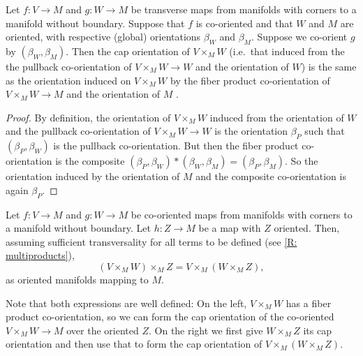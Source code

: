 \begin{lemma}\label{L: same induced}
	Let $f \colon V \to M$ and $g \colon W \to M$ be transverse maps from manifolds with corners to a manifold without boundary.
	Suppose that $f$ is co-oriented and that $W$ and $M$ are oriented, with respective (global) orientations $\beta_W$ and $\beta_M$.
	Suppose we co-orient $g$ by $(\beta_W,\beta_M)$.
	Then the cap orientation of $V \times_M W$ (i.e.\ that induced from the the pullback co-orientation of $V \times_M W \to W$ and the orientation of $W$) is the same as the orientation induced on $V \times_M W$ by the fiber product co-orientation of $V \times_M W \to M$ and the orientation of $M$ .
\end{lemma}

\begin{proof}
	By definition, the orientation of $V \times_M W$ induced from the orientation of $W$ and the pullback co-orientation of $V \times_M W \to W$ is the orientation $\beta_P$ such that $(\beta_P,\beta_W)$ is the pullback co-orientation.
	But then the fiber product co-orientation is the composite $(\beta_P,\beta_W)*(\beta_W,\beta_M) = (\beta_P,\beta_M)$.
	So the orientation induced by the orientation of $M$ and the composite co-orientation is again $\beta_P$.
\end{proof}

\begin{proposition}\label{P: OC mixed associativity}
	Let $f \colon V \to M$ and $g \colon W \to M$ be co-oriented maps from manifolds with corners to a manifold without boundary.
	Let $h \colon Z \to M$ be a map with $Z$ oriented.
	Then, assuming sufficient transversality for all terms to be defined (see \cref{R: multiproducts}),
	$$(V \times_M W) \times_M Z = V \times_M (W \times_M Z),$$
	as oriented manifolds mapping to $M$.
\end{proposition}

Note that both expressions are well defined: On the left, $V \times_M W$ has a fiber product co-orientation, so we can form the cap orientation of the co-oriented $V \times_M W \to M$ over the oriented $Z$.
On the right we first give $W \times_M Z$ its cap orientation and then use that to form the cap orientation of $V \times_M (W \times_M Z)$.


